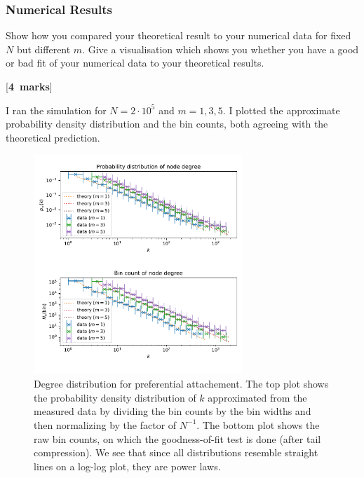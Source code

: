 \documentclass[a4paper,12pt]{article}
\newcounter{nmarks}
\newcommand{\qmarks}[1]{\addtocounter{nmarks}{#1} }
\renewcommand{\qmarks}[1]{\addtocounter{nmarks}{#1} \hspace*{\fill} [\textbf{#1~marks}]}
\begin{document}
\subsubsection{Numerical Results}
Show how you compared your theoretical result to your numerical data for fixed $N$ but different $m$.
Give a visualisation which shows you whether you have a good or bad fit of your numerical data to your theoretical results.
\qmarks{4}

I ran the simulation for $N=2\cdot 10^5$ and $m=1, 3, 5$. I plotted the approximate probability density distribution and the bin counts, both agreeing with the theoretical prediction.

\begin{figure}[htb]
  \begin{center}
      \includegraphics[width=0.7\textwidth]{images/task1_3.pdf}
  \end{center}
      \caption{Degree distribution for preferential attachement. The top plot shows the probability density distribution of $k$ approximated from the measured data by dividing the bin counts by the bin widths and then normalizing by the factor of $N^{-1}$. The bottom plot shows the raw bin counts, on which the goodness-of-fit test is done (after tail compression). We see that since all distributions resemble straight lines on a log-log plot, they are power laws.}
      \label{fig_task_1_3} %
\end{figure} 

\end{document}
